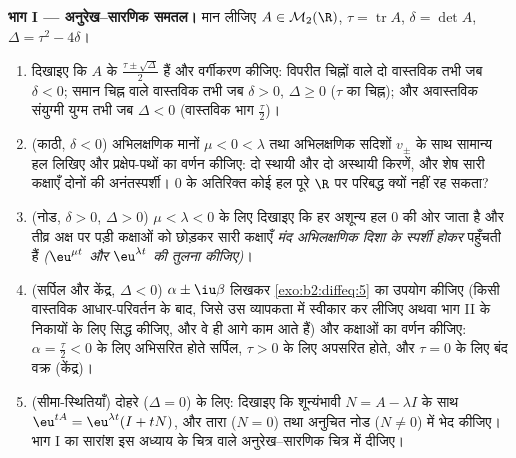 \begin{problem}
\medskip
\noindent\textbf{भाग I --- अनुरेख--सारणिक समतल।} मान लीजिए $A \in \mathcal M_2(\R)$, $\tau = \operatorname{tr}A$, $\delta
= \det A$,
$\Delta = \tau^2 - 4\delta$।
\begin{enumerate}
  \item दिखाइए कि $A$ के  $\frac{\tau\pm\sqrt\Delta}{2}$ हैं और वर्गीकरण कीजिए: विपरीत
        चिह्नों वाले दो वास्तविक  तभी जब $\delta < 0$; समान चिह्न
        वाले वास्तविक  तभी जब $\delta > 0$, $\Delta
        \geq 0$ ($\tau$ का चिह्न); और
        अवास्तविक संयुग्मी युग्म तभी जब $\Delta < 0$ (वास्तविक भाग $\frac\tau2$)।
  \item (काठी, $\delta < 0$) अभिलक्षणिक मानों $\mu < 0 <
        \lambda$ तथा अभिलक्षणिक सदिशों $v_\pm$ के
        साथ सामान्य हल लिखिए और प्रक्षेप-पथों का वर्णन कीजिए: दो स्थायी
        और दो अस्थायी किरणें, और शेष सारी कक्षाएँ दोनों की अनंतस्पर्शी।
        $0$ के अतिरिक्त कोई हल पूरे $\R$ पर परिबद्ध क्यों नहीं रह सकता?
  \item (नोड, $\delta > 0$, $\Delta > 0$) $\mu < \lambda
        < 0$ के लिए दिखाइए कि हर अशून्य हल $0$ की ओर
        जाता है और तीव्र अक्ष पर पड़ी कक्षाओं को छोड़कर सारी कक्षाएँ
        \emph{मंद अभिलक्षणिक दिशा के स्पर्शी होकर} पहुँचती हैं \emph{($\eu^{\mu t}$
        और $\eu^{\lambda t}$ की तुलना कीजिए)}।
  \item (सर्पिल और केंद्र, $\Delta < 0$)  $\alpha \pm \iu\beta$ लिखकर \cref{exo:b2:diffeq:5} का उपयोग
        कीजिए (किसी वास्तविक आधार-परिवर्तन के बाद, जिसे उस व्यापकता में
        स्वीकार कर लीजिए अथवा भाग II के निकायों के लिए सिद्ध कीजिए, और वे
        ही आगे काम आते हैं) और कक्षाओं का वर्णन कीजिए: $\alpha =
        \frac\tau2 < 0$ के लिए
        अभिसरित होते सर्पिल, $\tau > 0$ के लिए अपसरित होते, और $\tau = 0$ के लिए बंद
        वक्र (केंद्र)।
  \item (सीमा-स्थितियाँ) दोहरे  ($\Delta =
        0$) के लिए: दिखाइए कि
        शून्यंभावी $N
        = A - \lambda I$ के साथ $\eu^{tA} = \eu^{\lambda t}(I + tN)$, और तारा ($N = 0$) तथा अनुचित नोड ($N \neq 0$)
        में भेद कीजिए। भाग I का सारांश इस अध्याय के चित्र वाले
        अनुरेख--सारणिक चित्र में दीजिए।
\end{enumerate}


\end{problem}
